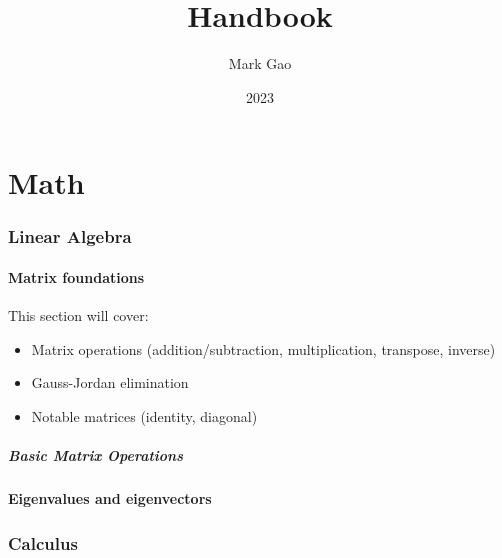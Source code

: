 \documentclass[10pt,a4paper,fleqn]{article} %
\begin{document}

\title{Handbook}
\author{Mark Gao}
\date{2023}
\maketitle

\newpage

\tableofcontents

\newpage


\part{Math}

\section{Linear Algebra} %

\subsection{Matrix foundations} %
This section will cover:
\begin{itemize}
    \item Matrix operations (addition/subtraction, multiplication, transpose, inverse)
    \item Gauss-Jordan elimination
    \item Notable matrices (identity, diagonal)
\end{itemize}

\subsubsection{Basic Matrix Operations}

\subsection{Eigenvalues and eigenvectors} %


\section{Calculus} %
\end{document}
